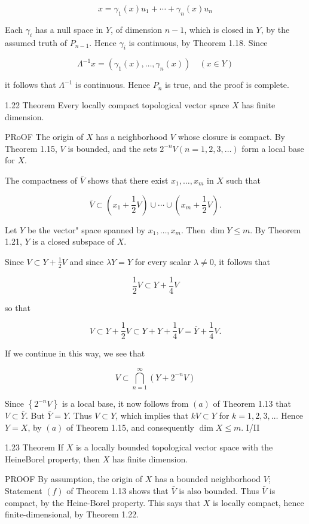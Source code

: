 \documentclass[10pt]{article}
\begin{document}
$$
x=\gamma_{1}(x) u_{1}+\cdots+\gamma_{n}(x) u_{n}
$$

Each $\gamma_{i}$ has a null space in $Y$, of dimension $n-1$, which is closed in $Y$, by the assumed truth of $P_{n-1}$. Hence $\gamma_{i}$ is continuous, by Theorem 1.18. Since

$$
\Lambda^{-1} x=\left(\gamma_{1}(x), \ldots, \gamma_{n}(x)\right) \quad(x \in Y)
$$

it follows that $\Lambda^{-1}$ is continuous. Hence $P_{n}$ is true, and the proof is complete.

1.22 Theorem Every locally compact topological vector space $X$ has finite dimension.

PRoOF The origin of $X$ has a neighborhood $V$ whose closure is compact. By Theorem 1.15, $V$ is bounded, and the sets $2^{-n} V(n=1,2,3, \ldots)$ form a local base for $X$.

The compactness of $\bar{V}$ shows that there exist $x_{1}, \ldots, x_{m}$ in $X$ such that

$$
\bar{V} \subset\left(x_{1}+\frac{1}{2} V\right) \cup \cdots \cup\left(x_{m}+\frac{1}{2} V\right) .
$$

Let $Y$ be the vector" space spanned by $x_{1}, \ldots, x_{m}$. Then $\operatorname{dim} Y \leq m$. By Theorem 1.21, $Y$ is a closed subspace of $X$.

Since $V \subset Y+\frac{1}{2} V$ and since $\lambda Y=Y$ for every scalar $\lambda \neq 0$, it follows that

$$
\frac{1}{2} V \subset Y+\frac{1}{4} V
$$

so that

$$
V \subset Y+\frac{1}{2} V \subset Y+Y+\frac{1}{4} V=\bar{Y}+\frac{1}{4} V .
$$

If we continue in this way, we see that

$$
V \subset \bigcap_{n=1}^{\infty}\left(Y+2^{-n} V\right)
$$

Since $\left\{2^{-n} V\right\}$ is a local base, it now follows from $(a)$ of Theorem 1.13 that $V \subset \bar{Y}$. But $\bar{Y}=Y$. Thus $V \subset Y$, which implies that $k V \subset Y$ for $k=1,2,3, \ldots$ Hence $Y=X$, by $(a)$ of Theorem 1.15, and consequently $\operatorname{dim} X \leq m$. I/II

1.23 Theorem If $X$ is a locally bounded topological vector space with the HeineBorel property, then $X$ has finite dimension.

PROOF By assumption, the origin of $X$ has a bounded neighborhood $V$; Statement $(f)$ of Theorem 1.13 shows that $\bar{V}$ is also bounded. Thus $\bar{V}$ is compact, by the Heine-Borel property. This says that $X$ is locally compact, hence finite-dimensional, by Theorem 1.22.
\end{document}
